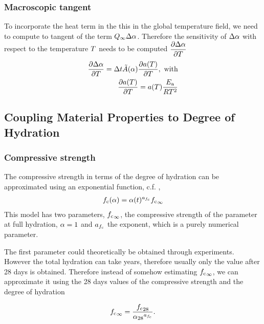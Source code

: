 \subsubsection{Macroscopic tangent}
To incorporate the heat term in the this in the global temperature field, we need to compute to tangent of the term $Q_{\infty}\Delta\alpha$.
Therefore the sensitivity of $\Delta\alpha$ with respect to the temperature $T$ needs to be computed $\dfrac{\partial \Delta\alpha}{\partial T}$
\begin{align}
	\dfrac{\partial \Delta\alpha}{\partial T} = \Delta t \tilde{A}(\alpha)\dfrac{\partial a(T)}{\partial T},\text{ with}\\
	\dfrac{\partial a(T)}{\partial T} = a(T) \frac{E_{\text{a}}}{RT^2}
\end{align}

\subsection{Coupling Material Properties to Degree of Hydration} \label{appendix:fem_evolution}
\subsubsection{Compressive strength}
The compressive strength in terms of the degree of hydration can be approximated using an exponential function, c.f. \cite{car_2016_mamt},
\begin{align}
	f_{\text{c}}(\alpha) = \alpha(t)^{a_{f_{\text{c}}}} {f_{\text{c}}}_\infty \label{eq:fcwrtDOH}
\end{align}
This model has two parameters, ${f_{\text{c}}}_\infty$, the compressive strength of the parameter at full hydration, $\alpha = 1$ and $a_{f_{\text{c}}}$ the exponent, which is a purely numerical parameter.

The first parameter could theoretically be obtained through experiments.
However the total hydration can take years, therefore usually only the value after 28 days is obtained.
Therefore instead of somehow estimating ${f_{\text{c}}}_\infty$, we can approximate it using the 28 days values of the compressive strength and the degree of hydration

\begin{align}
{f_{\text{c}}}_\infty = 	\dfrac{{f_{\text{c}}}_{28}}{{\alpha_{28}}^{a_{f_{\text{c}}}}}.
\end{align}
